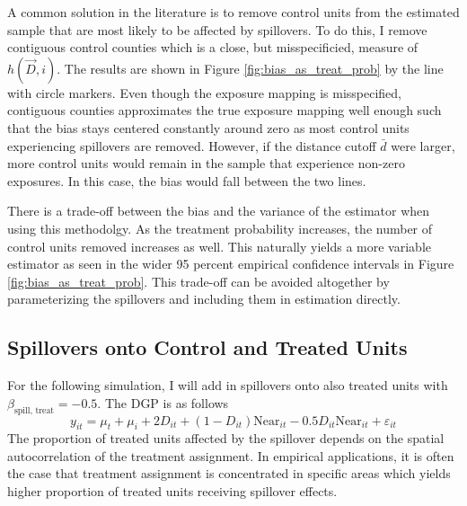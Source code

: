\documentclass[11pt]{article}
\begin{document}
A common solution in the literature is to remove control units from the estimated sample that are most likely to be affected by spillovers. To do this, I remove contiguous control counties which is a close, but misspecificied, measure of $h(\vec{D}, i)$. The results are shown in Figure \ref{fig:bias_as_treat_prob} by the line with circle markers. Even though the exposure mapping is misspecified, contiguous counties approximates the true exposure mapping well enough such that the bias stays centered constantly around zero as most control units experiencing spillovers are removed. However, if the distance cutoff $\bar{d}$ were larger, more control units would remain in the sample that experience non-zero exposures. In this case, the bias would fall between the two lines.

There is a trade-off between the bias and the variance of the estimator when using this methodolgy. As the treatment probability increases, the number of control units removed increases as well. This naturally yields a more variable estimator as seen in the wider 95 percent empirical confidence intervals in Figure \ref{fig:bias_as_treat_prob}. This trade-off can be avoided altogether by parameterizing the spillovers and including them in estimation directly.


\subsection{Spillovers onto Control and Treated Units}

For the following simulation, I will add in spillovers onto also treated units with $\beta_{\text{spill, treat}} = -0.5$. The DGP is as follows 
\begin{equation}\label{eq:dgp2} 
    y_{it} = \mu_t + \mu_i + 2 D_{it} + (1-D_{it}) \text{Near}_{it} - 0.5 D_{it} \text{Near}_{it} + \varepsilon_{it}   
\end{equation} 
The proportion of treated units affected by the spillover depends on the spatial autocorrelation of the treatment assignment. In empirical applications, it is often the case that treatment assignment is concentrated in specific areas which yields higher proportion of treated units receiving spillover effects.
\end{document}
